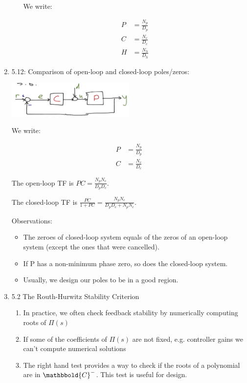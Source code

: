 \begin{enumerate}
\begin{itemize}
                    We write:

                    \begin{align*}
                        P &= \frac{N_p}{D_p} \\
                        C &= \frac{N_c}{D_c} \\
                        H &= \frac{N_h}{D_h}
                    \end{align*}
            \end{itemize}

        \item 5.12: Comparison of open-loop and closed-loop poles/zeros:

            \begin{center}\includegraphics[width=0.5\textwidth,keepaspectratio]{images/5-6.png}\end{center}

                We write:

                \begin{align*}
                    P &= \frac{N_p}{D_p} \\
                    C &= \frac{N_c}{D_c}
                \end{align*}

            The open-loop TF is $PC = \frac{N_p N_c}{D_p D_c}$.

            The closed-loop TF is $\frac{PC}{1+PC} = \frac{N_p N_c}{D_p D_c + N_p N_c}$.

            Observations:

            \begin{itemize}
                \item The zeroes of closed-loop system equals of the zeros of an open-loop system (except the ones that were cancelled).

                \item If P has a non-minimum phase zero, so does the closed-loop system.

                \item Usually, we design our poles to be in a good region.
            \end{itemize}

        \item 5.2 The Routh-Hurwitz Stability Criterion
            \begin{enumerate}
                \item In practice, we often check feedback stability by numerically computing roots of $\Pi(s)$
                \item If some of the coefficients of $\Pi(s)$ are not fixed, e.g. controller gains we can't compute numerical solutions
                \item The right hand test provides a way to check if the roots of a polynomial are in $\mathbbold{C}^-$. This test is useful for design.



\end{enumerate}
\end{enumerate}
